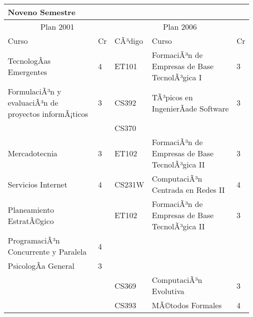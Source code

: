 \begin{center}
\begin{tabularx}{0.95\textwidth}{|p{4cm}|p{1cm}||p{2cm}|X|p{1cm}|}\hline
\multicolumn{5}{|l|}{\textbf{Noveno Semestre}} \\ \hline
\multicolumn{2}{|c|}{Plan 2001} & \multicolumn{3}{|c|}{Plan 2006} \\ \hline
Curso & Cr & CÃ³digo & Curso & Cr \\ \hline
TecnologÃ­as Emergentes & 4 & ET101 & FormaciÃ³n de Empresas de Base TecnolÃ³gica I & 3 \\ \hline
FormulaciÃ³n y evaluaciÃ³n de proyectos informÃ¡ticos & 3 & CS392 & TÃ³picos en IngenierÃ­ade Software & 3 \\ \hline
 &  & CS370 &  & \\ \hline
Mercadotecnia & 3 & ET102 & FormaciÃ³n de Empresas de Base TecnolÃ³gica II & 3 \\ \hline
Servicios Internet & 4 & CS231W & ComputaciÃ³n Centrada en Redes II & 4 \\ \hline
Planeamiento EstratÃ©gico &  & ET102 & FormaciÃ³n de Empresas de Base TecnolÃ³gica II & 3 \\ \hline
ProgramaciÃ³n Concurrente y Paralela & 4 &  &  & \\ \hline
PsicologÃ­a General & 3 &  &  & \\ \hline
 &  & CS369 & ComputaciÃ³n Evolutiva & 3 \\ \hline
 &  & CS393 & MÃ©todos Formales & 4 \\ \hline
\end{tabularx}
\end{center}

